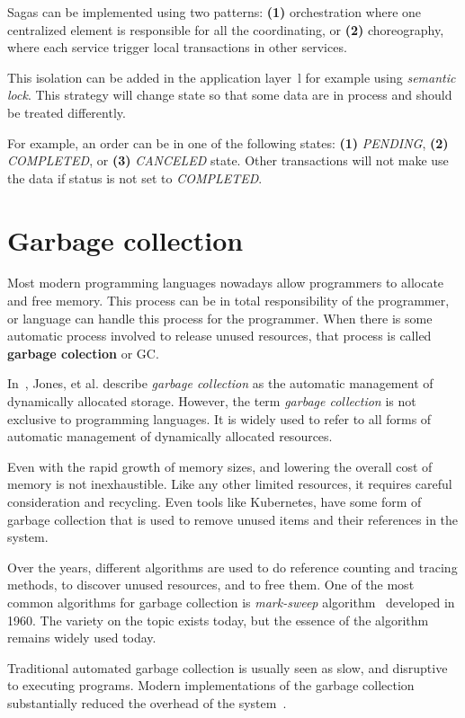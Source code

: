 \noindent
Sagas can be implemented using two patterns: \textbf{(1)} orchestration where one centralized element is responsible for all the coordinating, or \textbf{(2)} choreography, where each service trigger local transactions in other services.

This isolation can be added in the application layer~\cite{Frank}l for example using \emph{semantic lock}. This strategy will change state so that some data are in process and should be treated differently. 

For example, an order can be in one of the following states: \textbf{(1)} \emph{PENDING}, \textbf{(2)} \emph{COMPLETED}, or \textbf{(3)} \emph{CANCELED} state. Other transactions will not make use the data if status is not set to \emph{COMPLETED}.
%
%
\section{Garbage collection}\label{sec:garbage_collection}
%
Most modern programming languages nowadays allow programmers to allocate and free memory. This process can be in total responsibility of the programmer, or language can handle this process for the programmer. When there is some automatic process involved to release unused resources, that process is called \textbf{garbage colection} or GC. 

In~\cite{JonesL96}, Jones, et al. describe \emph{garbage collection} as the automatic management of dynamically allocated storage. However, the term \emph{garbage collection} is not exclusive to programming languages. It is widely used to refer to all forms of automatic management of dynamically allocated resources.

Even with the rapid growth of memory sizes, and lowering the overall cost of memory is not inexhaustible. Like any other limited resources, it requires careful consideration and recycling. Even tools like Kubernetes, have some form of garbage collection that is used to remove unused items and their references in the system.

Over the years, different algorithms are used to do reference counting and tracing methods, to discover unused resources, and to free them. One of the most common algorithms for garbage collection is \emph{mark-sweep} algorithm~\cite{McCarthy60} developed in 1960. The variety on the topic exists today, but the essence of the algorithm remains widely used today.

Traditional automated garbage collection is usually seen as slow, and disruptive to executing programs. Modern implementations of the garbage collection substantially reduced the overhead of the system~\cite{JonesL96}.
%
%
